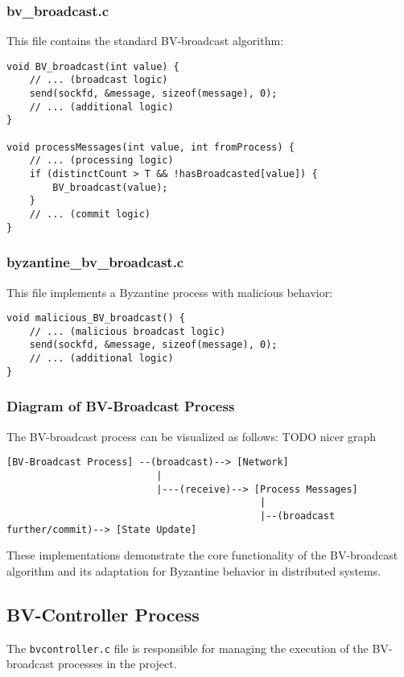 \documentclass[a4paper,11pt,oneside]{report}
\begin{document}
\subsubsection{bv\_broadcast.c}
This file contains the standard BV-broadcast algorithm:

\begin{verbatim}
void BV_broadcast(int value) {
    // ... (broadcast logic)
    send(sockfd, &message, sizeof(message), 0);
    // ... (additional logic)
}

void processMessages(int value, int fromProcess) {
    // ... (processing logic)
    if (distinctCount > T && !hasBroadcasted[value]) {
        BV_broadcast(value);
    }
    // ... (commit logic)
}
\end{verbatim}

\subsubsection{byzantine\_bv\_broadcast.c}
This file implements a Byzantine process with malicious behavior:

\begin{verbatim}
void malicious_BV_broadcast() {
    // ... (malicious broadcast logic)
    send(sockfd, &message, sizeof(message), 0);
    // ... (additional logic)
}
\end{verbatim}

\subsubsection{Diagram of BV-Broadcast Process}
The BV-broadcast process can be visualized as follows:
TODO nicer graph

\begin{verbatim}
[BV-Broadcast Process] --(broadcast)--> [Network]
                          |
                          |---(receive)--> [Process Messages]
                                            |
                                            |--(broadcast further/commit)--> [State Update]
\end{verbatim}

These implementations demonstrate the core functionality of the BV-broadcast algorithm and its adaptation for Byzantine behavior in distributed systems.

\subsection{BV-Controller Process}
The \texttt{bvcontroller.c} file is responsible for managing the execution of the BV-broadcast processes in the project.
\end{document}
